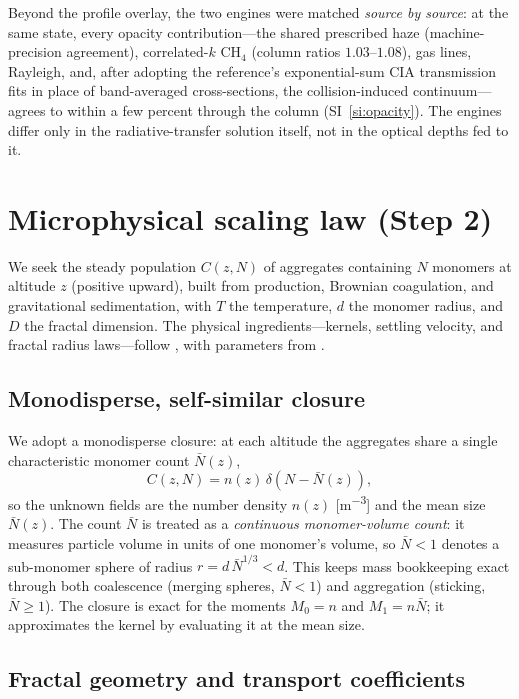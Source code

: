 \documentclass[11pt]{article}
\newcommand{\Nbar}{\bar{N}}
\newcommand{\Df}{D}
\begin{document}
Beyond the profile overlay, the two engines were matched \emph{source by
source}: at the same state, every opacity contribution---the shared prescribed
haze (machine-precision agreement), correlated-$k$ CH$_4$ (column ratios
$1.03$--$1.08$), gas lines, Rayleigh, and, after adopting the reference's
exponential-sum CIA transmission fits in place of band-averaged cross-sections,
the collision-induced continuum---agrees to within a few percent through the
column (SI~\ref{si:opacity}).  The engines differ only in the radiative-transfer
solution itself, not in the optical depths fed to it.

\section{Microphysical scaling law (Step 2)}
\label{sec:scaling}

We seek the steady population $C(z,N)$ of aggregates containing $N$ monomers at
altitude $z$ (positive upward), built from production, Brownian coagulation, and
gravitational sedimentation, with $T$ the temperature, $d$ the monomer radius,
and $\Df$ the fractal dimension. The physical ingredients---kernels, settling
velocity, and fractal radius laws---follow \citet{Burgalat2017}, with parameters
from \citet{deTrenquelleon2025}.

\subsection{Monodisperse, self-similar closure}

We adopt a monodisperse closure: at each altitude the aggregates share a single
characteristic monomer count $\Nbar(z)$,
\begin{equation}
  C(z,N) = n(z)\,\delta\!\left(N-\Nbar(z)\right),
  \label{eq:closure}
\end{equation}
so the unknown fields are the number density $n(z)$ [\si{m^{-3}}] and the mean
size $\Nbar(z)$. The count $\Nbar$ is treated as a \emph{continuous
monomer-volume count}: it measures particle volume in units of one monomer's
volume, so $\Nbar<1$ denotes a sub-monomer sphere of radius
$r=d\,\Nbar^{1/3}<d$. This keeps mass bookkeeping exact through both coalescence
(merging spheres, $\Nbar<1$) and aggregation (sticking, $\Nbar\ge1$). The
closure is exact for the moments $M_0=n$ and $M_1=n\Nbar$; it approximates the
kernel by evaluating it at the mean size.

\subsection{Fractal geometry and transport coefficients}
\end{document}
